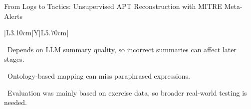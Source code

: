 \documentclass[aspectratio=169,10pt]{beamer}
\begin{document}
\begin{frame}[t]{From Logs to Tactics: Unsupervised APT Reconstruction with MITRE Meta-Alerts}
{\begin{tabularx}{\textwidth}{|L{3.10cm}|Y|L{5.70cm}|}
\begin{minipage}[t]{\linewidth}
\textbullet~Depends on LLM summary quality, so incorrect summaries can affect later stages.\par\vspace{1.8pt}\textbullet~Ontology-based mapping can miss paraphrased expressions.\par\vspace{1.8pt}\textbullet~Evaluation was mainly based on exercise data, so broader real-world testing is needed.\par\vspace{3pt}
\end{minipage} \\\hline
\end{tabularx}}
\end{frame}

\end{document}
